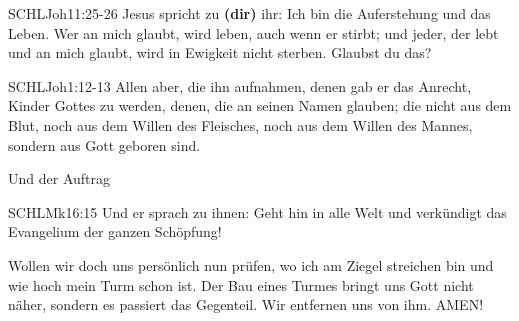 \documentclass[12pt]{../../inc/mybib}
\begin{document}
    \begin{bibelbox}{SCHL}{Joh}{11:25-26}
        Jesus spricht zu \textbf{(dir)} ihr: Ich bin die Auferstehung und das Leben. Wer an mich glaubt, wird leben, auch wenn er stirbt; und jeder, der lebt und an mich glaubt, wird in Ewigkeit nicht sterben. Glaubst du das?
    \end{bibelbox} 
    \begin{bibelbox}{SCHL}{Joh}{1:12-13}
        Allen aber, die ihn aufnahmen, denen gab er das Anrecht, Kinder Gottes zu werden, denen, die an seinen Namen glauben;
        die nicht aus dem Blut, noch aus dem Willen des Fleisches, noch aus dem Willen des Mannes, sondern aus Gott geboren sind.
    \end{bibelbox}     
    Und der Auftrag
    \begin{bibelbox}{SCHL}{Mk}{16:15}
        Und er sprach zu ihnen: Geht hin in alle Welt und verkündigt das Evangelium der ganzen Schöpfung!
    \end{bibelbox} 
    Wollen wir doch uns persönlich nun prüfen, wo ich am Ziegel streichen bin und wie hoch mein Turm schon ist. Der Bau eines Turmes bringt uns Gott nicht näher, sondern es passiert das Gegenteil. Wir entfernen uns von ihm. AMEN!
    
    \beten{}   
    
\end{document}

